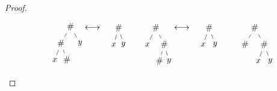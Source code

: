 \documentclass{CSML}
\newcommand{\toto}{\longleftrightarrow}
\begin{document}
\begin{proof}
\begin{figure}
\small
\[
\begin{array}{rclcrclcrclrclc}
\begin{minipage}[t]{7mm}
\vspace{-4mm}
\begin{tikzpicture}
  [level distance=7mm,
   level 1/.style={sibling distance=8mm},
   level 2/.style={sibling distance=5mm}]
\node {$\#$}
 child { node {$\#$}
         child { node {$x$} }
         child { node {$\#$} }
       }
 child { node {$y$} };
\end{tikzpicture}
\end{minipage}
&
\vspace{-0mm}\,\,\,\,\,\,\,\toto
&
\begin{minipage}[t]{7mm}
\vspace{-3.5mm}
\begin{tikzpicture}
  [level distance=7mm,
   level 1/.style={sibling distance=4mm}]
\node {$\#$}
 child { node {$x$} }
 child { node {$y$} };
\end{tikzpicture}
\end{minipage}
& & 
\begin{minipage}[t]{8mm}
\vspace{-3.5mm}
\begin{tikzpicture}
  [level distance=7mm,
   level 1/.style={sibling distance=7mm},
   level 2/.style={sibling distance=4mm}]
\node {$\#$}
 child { node {$x$} }
 child { node {$\#$}
         child { node {$\#$} }
         child { node {$y$} }
       };
\end{tikzpicture}
\end{minipage}
&
\vspace{-0mm}\,\,\,\toto
&
\begin{minipage}[t]{10mm}
\vspace{-3.5mm}
\begin{tikzpicture}
  [level distance=7mm,
   level 1/.style={sibling distance=5mm}]
\node {$\#$}
 child { node {$x$} }
 child { node {$y$} };
\end{tikzpicture}
\end{minipage}
& & 
\begin{minipage}[t]{10mm}
\vspace{-3.5mm}
\begin{tikzpicture}
  [level distance=7mm,
   level 1/.style={sibling distance=8mm},
   level 2/.style={sibling distance=5mm}]
\node {$\#$}
 child { node {$\#$} }
 child { node {$\#$}
         child { node {$x$} }
         child { node {$y$} }
       };
\end{tikzpicture}

\end{minipage}
\end{array}\]
\end{figure}
\end{proof}
\end{document}
